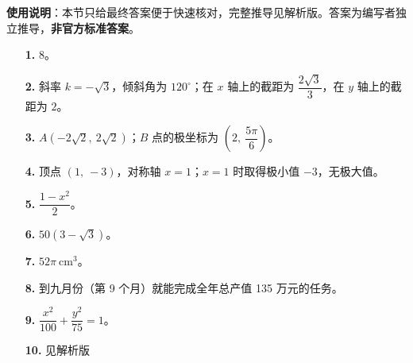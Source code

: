 
\begin{gknotice}
\textbf{使用说明}：本节只给最终答案便于快速核对，完整推导见解析版。答案为编写者独立推导，\textbf{非官方标准答案}。
\end{gknotice}

\begin{itemize}[leftmargin=2.6em]
  \item[\textbf{1.}] $8$。
  \item[\textbf{2.}] 斜率 $k=-\sqrt{3}$，倾斜角为 $120^\circ$；在 $x$ 轴上的截距为 $\dfrac{2\sqrt{3}}{3}$，在 $y$ 轴上的截距为 $2$。
  \item[\textbf{3.}] $A(-2\sqrt{2},\ 2\sqrt{2})$；$B$ 点的极坐标为 $\left(2,\ \dfrac{5\pi}{6}\right)$。
  \item[\textbf{4.}] 顶点 $(1,\ -3)$，对称轴 $x=1$；$x=1$ 时取得极小值 $-3$，无极大值。
  \item[\textbf{5.}] $\dfrac{1-x^{2}}{2}$。
  \item[\textbf{6.}] $50(3-\sqrt{3})$。
  \item[\textbf{7.}] $52\pi\ \mathrm{cm^{3}}$。
  \item[\textbf{8.}] 到九月份（第 9 个月）就能完成全年总产值 135 万元的任务。
  \item[\textbf{9.}] $\dfrac{x^{2}}{100}+\dfrac{y^{2}}{75}=1$。
  \item[\textbf{10.}] 见解析版
\end{itemize}
